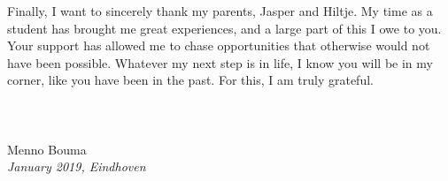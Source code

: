 \documentclass[../DC2019003Bouma.tex]{subfiles}
\begin{document}
Finally, I want to sincerely thank my parents, Jasper and Hiltje. My time as a student has brought me great experiences, and a large part of this I owe to you. Your support has allowed me to chase opportunities that otherwise would not have been possible. Whatever my next step is in life, I know you will be in my corner, like you have been in the past. For this, I am truly grateful.\\\\\\\\
Menno Bouma\\
\textit{January 2019, Eindhoven}
\end{document}
